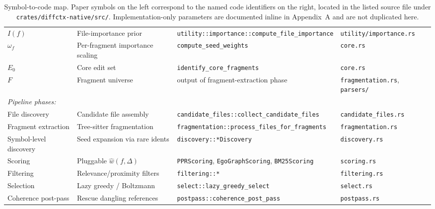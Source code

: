 \documentclass[11pt, a4paper]{article}
\begin{document}
\begin{table}[h]
{\begin{tabular}{lp{4.5cm}p{7cm}p{4.2cm}}
$I(f)$              & File-importance prior          & \texttt{utility::importance::compute\_file\_importance} & \texttt{utility/importance.rs} \\
$\omega_f$          & Per-fragment importance scaling & \texttt{compute\_seed\_weights}               & \texttt{core.rs} \\
$E_0$               & Core edit set                  & \texttt{identify\_core\_fragments}             & \texttt{core.rs} \\
$F$                 & Fragment universe              & output of fragment-extraction phase            & \texttt{fragmentation.rs}, \texttt{parsers/} \\
\midrule
\multicolumn{4}{l}{\emph{Pipeline phases:}} \\
File discovery      & Candidate file assembly        & \texttt{candidate\_files::collect\_candidate\_files} & \texttt{candidate\_files.rs} \\
Fragment extraction & Tree-sitter fragmentation      & \texttt{fragmentation::process\_files\_for\_fragments} & \texttt{fragmentation.rs} \\
Symbol-level discovery & Seed expansion via rare idents & \texttt{discovery::*Discovery}              & \texttt{discovery.rs} \\
Scoring             & Pluggable $\hat{w}(f, \Delta)$ & \texttt{PPRScoring}, \texttt{EgoGraphScoring}, \texttt{BM25Scoring} & \texttt{scoring.rs} \\
Filtering           & Relevance/proximity filters    & \texttt{filtering::*}                          & \texttt{filtering.rs} \\
Selection           & Lazy greedy / Boltzmann        & \texttt{select::lazy\_greedy\_select}          & \texttt{select.rs} \\
Coherence post-pass & Rescue dangling references     & \texttt{postpass::coherence\_post\_pass}       & \texttt{postpass.rs} \\
\bottomrule
\end{tabular}}
\caption{Symbol-to-code map. Paper symbols on the left correspond to the named code identifiers on the right, located in the listed source file under \texttt{crates/diffctx-native/src/}. Implementation-only parameters are documented inline in Appendix~A and are not duplicated here.}
\label{tab:symbol-map}
\end{table}



\end{document}
